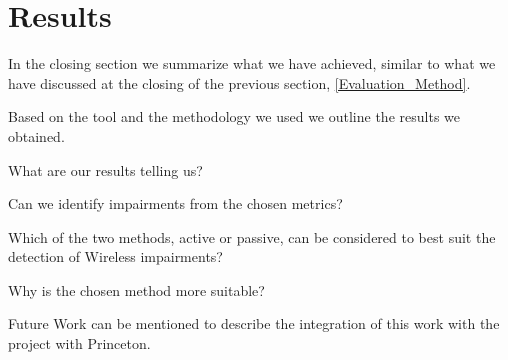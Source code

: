 \section{Results}\label{Results}

In the closing section we summarize what we have achieved, similar to what we have discussed at the closing of the previous section, \ref{Evaluation_Method}.

Based on the tool and the methodology we used we outline the results we obtained.

What are our results telling us?

Can we identify impairments from the chosen metrics?

Which of the two methods, active or passive, can be considered to best suit the detection of Wireless impairments?

Why is the chosen method more suitable?

Future Work can be mentioned to describe the integration of this work with the project with Princeton.